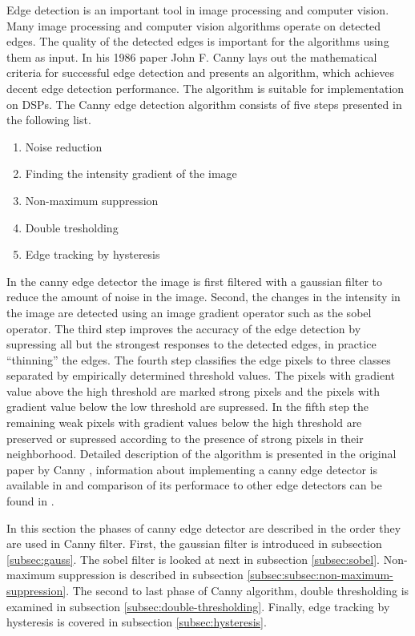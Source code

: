 Edge detection is an important tool in image processing and computer vision. Many image processing and computer vision algorithms operate on detected edges. The quality of the detected edges is important for the algorithms using them as input. In his 1986 paper John F. Canny \cite{canny1986computational} lays out the mathematical criteria for successful edge detection and presents an algorithm, which achieves decent edge detection performance. The algorithm is suitable for implementation on DSPs. The Canny edge detection algorithm consists of five steps presented in the following list.

\begin{enumerate}
    \item{Noise reduction}
    \item{Finding the intensity gradient of the image}
    \item{Non-maximum suppression}
    \item{Double tresholding}
    \item{Edge tracking by hysteresis}
\end{enumerate}

In the canny edge detector the image is first filtered with a gaussian filter to reduce the amount of noise in the image. Second, the changes in the intensity in the image are detected using an image gradient operator such as the sobel operator. The third step improves the accuracy of the edge detection by supressing all but the strongest responses to the detected edges, in practice ``thinning'' the edges. The fourth step classifies the edge pixels to three classes separated by empirically determined threshold values. The pixels with gradient value above the high threshold are marked strong pixels and the pixels with gradient value below the low threshold are supressed. In the fifth step the remaining weak pixels with gradient values below the high threshold are preserved or supressed according to the presence of strong pixels in their neighborhood. Detailed description of the algorithm is presented in the original paper by Canny \cite{canny1986computational}, information about implementing a canny edge detector is available in \cite{gonzalez2008digital} and comparison of its performace to other edge detectors can be found in \cite{maini2009study}.

In this section the phases of canny edge detector are described in the order they are used in Canny filter. First, the gaussian filter is introduced in subsection \ref{subsec:gauss}. The sobel filter is looked at next in subsection \ref{subsec:sobel}. Non-maximum suppression is described in subsection \ref{subsec:subsec:non-maximum-suppression}. The second to last phase of Canny algorithm, double thresholding is examined in subsection \ref{subsec:double-thresholding}. Finally, edge tracking by hysteresis is covered in subsection \ref{subsec:hysteresis}.

